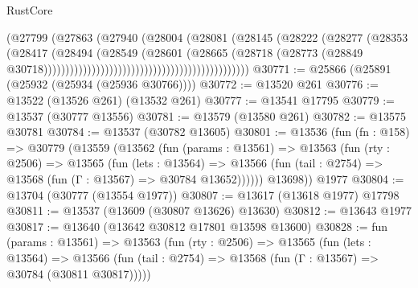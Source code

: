 \begin{lexlean}{RustCore}
\begin{coremodule}
                                                                (@27799
                                                                  (@27863
                                                                    (@27940
                                                                      (@28004
                                                                        (@28081
                                                                          (@28145
                                                                            (@28222
                                                                              (@28277
                                                                                (@28353
                                                                                  (@28417
                                                                                    (@28494
                                                                                      (@28549
                                                                                        (@28601
                                                                                          (@28665
                                                                                            (@28718
                                                                                              (@28773
                                                                                                (@28849
                                                                                                  @30718)))))))))))))))))))))))))))))))))))))))))))))))
@30771 := @25866 (@25891 (@25932 (@25934 (@25936 @30766))))
@30772 := @13520 @261
@30776 := @13522 (@13526 @261) (@13532 @261)
@30777 := @13541 @17795
@30779 := @13537 (@30777 @13556)
@30781 := @13579 (@13580 @261)
@30782 := @13575 @30781
@30784 := @13537 (@30782 @13605)
@30801 := @13536
    (fun (fn : @158) =>
    @30779
      (@13559
        (@13562
          (fun (params : @13561) =>
          @13563
            (fun (rty : @2506) =>
            @13565
              (fun (lets : @13564) =>
              @13566 (fun (tail : @2754) => @13568 (fun (Γ : @13567) => @30784 @13652))))))
        @13698))
    @1977
@30804 := @13704 (@30777 (@13554 @1977))
@30807 := @13617 (@13618 @1977) @17798
@30811 := @13537 (@13609 (@30807 @13626) @13630)
@30812 := @13643 @1977
@30817 := @13640 (@13642 @30812 @17801 @13598 @13600)
@30828 := fun (params : @13561) =>
  @13563
    (fun (rty : @2506) =>
    @13565
      (fun (lets : @13564) =>
      @13566 (fun (tail : @2754) => @13568 (fun (Γ : @13567) => @30784 (@30811 @30817)))))

\end{coremodule}
\end{lexlean}
